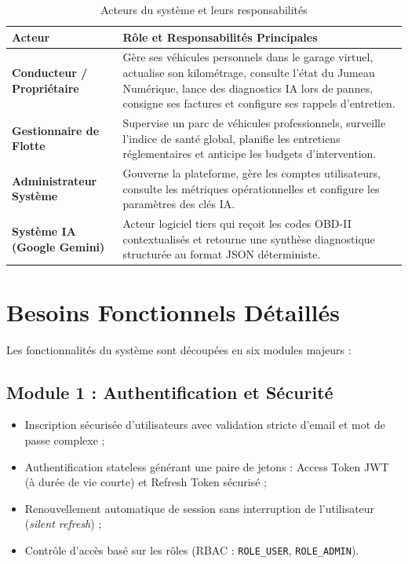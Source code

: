 \documentclass[12pt,a4paper,oneside]{report}
\newcommand{\bpuce}{\textcolor{midBlue}{$\blacktriangleright$}\;}
\begin{document}
\begin{table}[H]
\centering
\small
\begin{tabularx}{\textwidth}{p{3.2cm} X}
\toprule
\textbf{Acteur} & \textbf{R\^ole et Responsabilit\'es Principales} \\
\midrule
\textbf{Conducteur / Propri\'etaire} & G\`ere ses v\'ehicules personnels dans le garage virtuel, actualise son kilom\'etrage, consulte l'\'etat du Jumeau Num\'erique, lance des diagnostics IA lors de pannes, consigne ses factures et configure ses rappels d'entretien. \\
\addlinespace
\textbf{Gestionnaire de Flotte} & Supervise un parc de v\'ehicules professionnels, surveille l'indice de sant\'e global, planifie les entretiens r\'eglementaires et anticipe les budgets d'intervention. \\
\addlinespace
\textbf{Administrateur Syst\`eme} & Gouverne la plateforme, g\`ere les comptes utilisateurs, consulte les m\'etriques op\'erationnelles et configure les param\`etres des cl\'es IA. \\
\addlinespace
\textbf{Syst\`eme IA (Google Gemini)} & Acteur logiciel tiers qui re\c{c}oit les codes OBD-II contextualis\'es et retourne une synth\`ese diagnostique structur\'ee au format JSON d\'eterministe. \\
\bottomrule
\end{tabularx}
\caption{Acteurs du syst\`eme et leurs responsabilit\'es}
\label{tab:acteurs}
\end{table}

\section{Besoins Fonctionnels D\'etaill\'es}
Les fonctionnalit\'es du syst\`eme sont d\'ecoup\'ees en six modules majeurs :

\subsection{Module 1 : Authentification et S\'ecurit\'e}
\begin{itemize}[label=\bpuce]
  \item Inscription s\'ecuris\'ee d'utilisateurs avec validation stricte d'email et mot de passe complexe ;
  \item Authentification stateless g\'en\'erant une paire de jetons : Access Token JWT (\`a dur\'ee de vie courte) et Refresh Token s\'ecuris\'e ;
  \item Renouvellement automatique de session sans interruption de l'utilisateur (\textit{silent refresh}) ;
  \item Contr\^ole d'acc\`es bas\'e sur les r\^oles (RBAC : \texttt{ROLE\_USER}, \texttt{ROLE\_ADMIN}).
\end{itemize}
\end{document}
